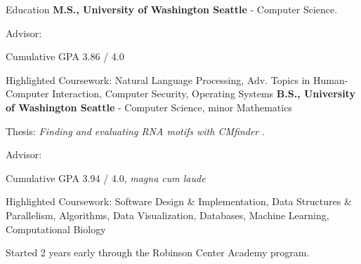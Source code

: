 \begin{rubric}{Education}
	\textbf{M.S., University of Washington Seattle} - Computer Science.
    \par Advisor: \pWeldD{}
    \par Cumulative GPA 3.86 / 4.0
    \par Highlighted Coursework: Natural Language Processing, Adv. Topics in Human-Computer Interaction, Computer Security, Operating Systems
\entry*[2016 -- 2019] %
	\textbf{B.S., University of Washington Seattle} - Computer Science, minor Mathematics
	\par Thesis: \emph{Finding and evaluating RNA motifs with CMfinder} \cite{zhou2019thesis}.
	\par Advisor: \pRuzzoL{}
	\par Cumulative GPA 3.94 / 4.0, \textit{magna cum laude}
	\par Highlighted Coursework: Software Design \& Implementation, Data Structures \& Parallelism, Algorithms, Data Visualization, Databases, Machine Learning, Computational Biology
	\par Started 2 years early through the Robinson Center Academy program.
\end{rubric}